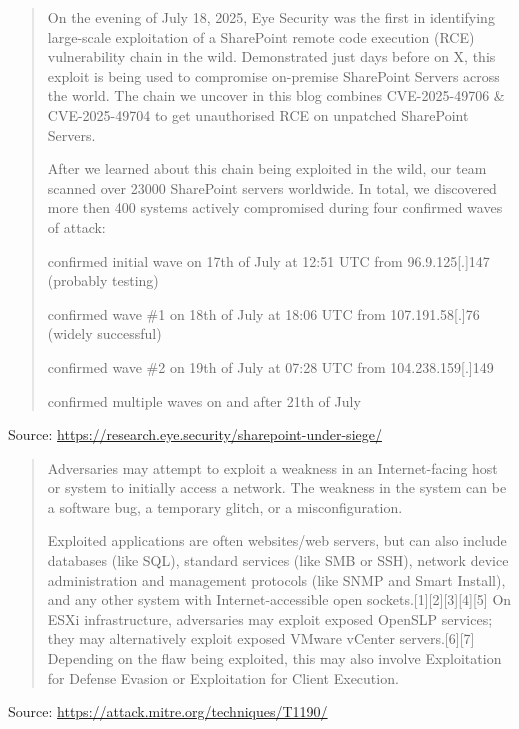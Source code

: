\documentclass[Screen16to9,17pt]{foils}
\begin{document}

\begin{quote}
On the evening of July 18, 2025, Eye Security was the first in identifying large-scale exploitation of a SharePoint remote code execution (RCE) vulnerability chain in the wild. Demonstrated just days before on X, this exploit is being used to compromise on-premise SharePoint Servers across the world. The chain we uncover in this blog combines CVE-2025-49706 \& CVE-2025-49704 to get unauthorised RCE on unpatched SharePoint Servers.

After we learned about this chain being exploited in the wild, our team scanned over 23000 SharePoint servers worldwide. In total, we discovered more then 400 systems actively compromised during four confirmed waves of attack:

\begin{list2}
\item     confirmed initial wave on 17th of July at 12:51 UTC from 96.9.125[.]147 (probably testing)
\item     confirmed wave \#1 on 18th of July at 18:06 UTC from 107.191.58[.]76 (widely successful)
\item     confirmed wave \#2 on 19th of July at 07:28 UTC from 104.238.159[.]149
\item     confirmed multiple waves on and after 21th of July
\end{list2}

\end{quote}
Source: \url{https://research.eye.security/sharepoint-under-siege/}



\begin{quote}
Adversaries may attempt to exploit a weakness in an Internet-facing host or system to initially access a network. The weakness in the system can be a software bug, a temporary glitch, or a misconfiguration.

Exploited applications are often websites/web servers, but can also include databases (like SQL), standard services (like SMB or SSH), network device administration and management protocols (like SNMP and Smart Install), and any other system with Internet-accessible open sockets.[1][2][3][4][5] On ESXi infrastructure, adversaries may exploit exposed OpenSLP services; they may alternatively exploit exposed VMware vCenter servers.[6][7] Depending on the flaw being exploited, this may also involve Exploitation for Defense Evasion or Exploitation for Client Execution.
\end{quote}
Source: \url{https://attack.mitre.org/techniques/T1190/}
\end{document}
